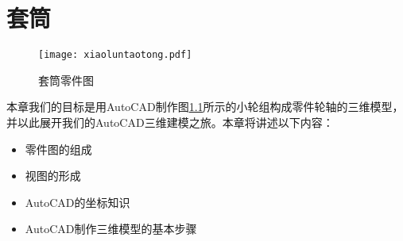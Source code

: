 \chapter{套筒}
\begin{figure}[htbp]
\centering
\texttt{[image: xiaoluntaotong.pdf]}
\caption{套筒零件图}\label{fig:xiaoluntaotong}
\end{figure}
本章我们的目标是用AutoCAD制作图\ref{fig:xiaoluntaotong}所示的小轮组构成零件轮轴的三维模型，并以此展开我们的AutoCAD三维建模之旅。本章将讲述以下内容：
\begin{itemize}
	\item 零件图的组成
	\item 视图的形成
	\item AutoCAD的坐标知识
	\item AutoCAD制作三维模型的基本步骤
\end{itemize}

\endinput
